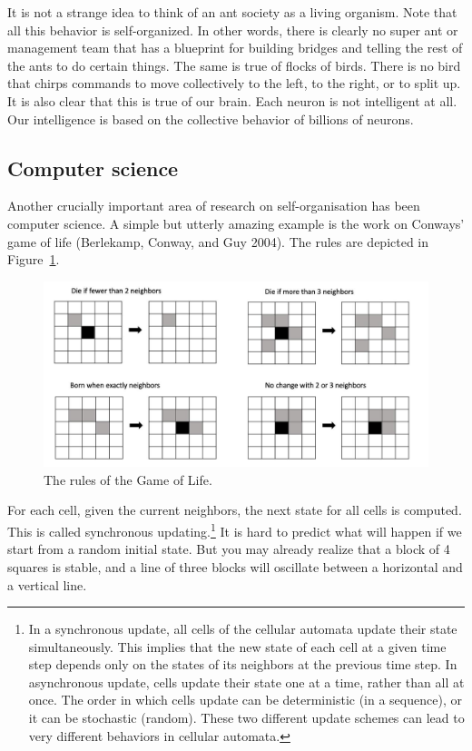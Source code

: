 \documentclass[
  a4paper,
  DIV=11,
  numbers=noendperiod]{scrreprt}
\begin{document}
It is not a strange idea to think of an ant society as a living
organism. Note that all this behavior is self-organized. In other words,
there is clearly no super ant or management team that has a blueprint
for building bridges and telling the rest of the ants to do certain
things. The same is true of flocks of birds. There is no bird that
chirps commands to move collectively to the left, to the right, or to
split up. It is also clear that this is true of our brain. Each neuron
is not intelligent at all. Our intelligence is based on the collective
behavior of billions of neurons.

\hypertarget{sec-Computer-science}{%
\subsection{Computer science}\label{sec-Computer-science}}

Another crucially important area of research on self-organisation has
been computer science. A simple but utterly amazing example is the work
on Conways' game of life (Berlekamp, Conway, and Guy 2004). The rules
are depicted in Figure~\ref{fig-ch5n-img3-old-41}.

\begin{figure}

{\centering \includegraphics{media/ch5n/image3.jpg}

}

\caption{\label{fig-ch5n-img3-old-41}The rules of the Game of Life.}

\end{figure}

For each cell, given the current neighbors, the next state for all cells
is computed. This is called synchronous updating.\footnote{In a
  synchronous update, all cells of the cellular automata update their
  state simultaneously. This implies that the new state of each cell at
  a given time step depends only on the states of its neighbors at the
  previous time step. In asynchronous update, cells update their state
  one at a time, rather than all at once. The order in which cells
  update can be deterministic (in a sequence), or it can be stochastic
  (random). These two different update schemes can lead to very
  different behaviors in cellular automata.} It is hard to predict what
will happen if we start from a random initial state. But you may already
realize that a block of 4 squares is stable, and a line of three blocks
will oscillate between a horizontal and a vertical line.
\end{document}
